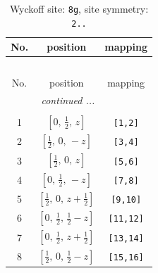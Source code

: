 \documentclass[fleqn,8pt]{jsarticle}
\begin{document}
\renewcommand{\arraystretch}{1.2}
\begin{longtable}{ccc}
\caption{Wyckoff site: {\tt 8g}, site symmetry: {\tt 2..}}
 \\
 \hline \hline
No. & position & mapping \\ \hline \endfirsthead

\multicolumn{2}{l}{\tablename\ \thetable{}} \\
 \hline \hline
No. & position & mapping \\ \hline \endhead

 \hline \hline
\multicolumn{2}{r}{\footnotesize\it continued ...} \\ \endfoot

 \hline \hline
\multicolumn{2}{r}{} \\ \endlastfoot

1 & $\left[ 0,\, \frac{1}{2},\, z \right]$ & {\tt [1,2]} \\ \hline
2 & $\left[ \frac{1}{2},\, 0,\, - z \right]$ & {\tt [3,4]} \\ \hline
3 & $\left[ \frac{1}{2},\, 0,\, z \right]$ & {\tt [5,6]} \\ \hline
4 & $\left[ 0,\, \frac{1}{2},\, - z \right]$ & {\tt [7,8]} \\ \hline
5 & $\left[ \frac{1}{2},\, 0,\, z + \frac{1}{2} \right]$ & {\tt [9,10]} \\ \hline
6 & $\left[ 0,\, \frac{1}{2},\, \frac{1}{2} - z \right]$ & {\tt [11,12]} \\ \hline
7 & $\left[ 0,\, \frac{1}{2},\, z + \frac{1}{2} \right]$ & {\tt [13,14]} \\ \hline
8 & $\left[ \frac{1}{2},\, 0,\, \frac{1}{2} - z \right]$ & {\tt [15,16]} \\
\end{longtable}
\renewcommand{\arraystretch}{1.2}
\end{document}
